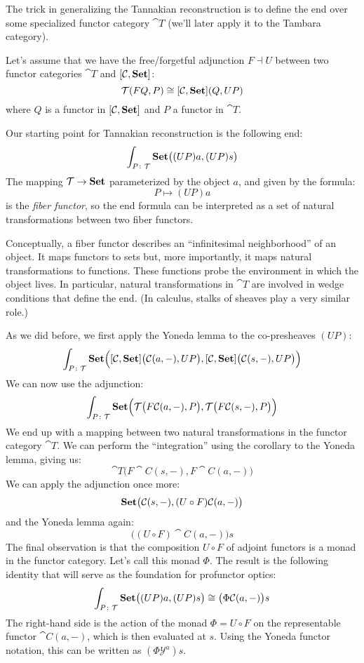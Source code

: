 \documentclass[DaoFP]{subfiles}
\begin{document}
The trick in generalizing the Tannakian reconstruction is to define the end over some specialized functor category $\cat T$ (we'll later apply it to the Tambara category). 

Let's assume that we have the free/forgetful adjunction $F \dashv U$ between two functor categories $\cat T$ and $[\mathcal{C}, \mathbf{Set}]$:
\[ \mathcal{T} (F Q, P) \cong  [\mathcal{C}, \mathbf{Set}] ( Q, U P )\]
where $Q$ is a functor in $[\mathcal{C}, \mathbf{Set}]$ and $P$ a functor in $\cat T$.

Our starting point for Tannakian reconstruction is the following end:
\[ \int_{P \colon \mathcal{T}} \mathbf{Set} \big((U P) a, (U P) s\big) \]
The mapping $\mathcal{T} \to \mathbf{Set}$ parameterized by the object $a$, and given by the formula:
\[ P \mapsto (U P) a \]
is the \emph{fiber functor}, so the end formula can be interpreted as a set of natural transformations between two fiber functors. 

Conceptually, a fiber functor describes an ``infinitesimal neighborhood'' of an object. It maps functors to sets but, more importantly, it maps natural transformations to functions. These functions probe the environment in which the object lives. In particular, natural transformations in $\cat T$ are involved in wedge conditions that define the end. (In calculus, stalks of sheaves play a very similar role.)

As we did before, we first apply the Yoneda lemma to the co-presheaves $(U P)$:
\[ \int_{P \colon \mathcal{T}} \mathbf{Set} \Big([\mathcal{C}, \mathbf{Set}] \big( \mathcal{C} (a ,-), U P\big), [\mathcal{C}, \mathbf{Set}] \big( \mathcal{C} (s ,-), U P\big)\Big) \]
We can now use the adjunction:
\[ \int_{P \colon \mathcal{T}} \mathbf{Set} \Big(\mathcal{T} \big( F \mathcal{C} (a ,-), P\big), \mathcal{T} \big( F \mathcal{C} (s ,-), P\big)\Big) \]
We end up with a mapping between two natural transformations in the functor category $\cat T$. We can perform the ``integration'' using the corollary to the Yoneda lemma, giving us:
\[ \cat T\big( F \cat C (s ,-), F \cat C (a ,-) \big) \]
We can apply the adjunction once more:
\[ \mathbf{Set} \big( \mathcal{C} (s ,-), (U\circ F) \mathcal{C} (a ,-) \big) \]
and the Yoneda lemma again:
\[ \big( (U\circ F) \cat C (a ,-) \big) s \]
The final observation is that the composition $U \circ F$ of adjoint functors is a monad in the functor category. Let's call this monad $\Phi$. The result is the following identity that will serve as the foundation for profunctor optics:
\[ \int_{P \colon \mathcal{T}} \mathbf{Set} \big((U P) a, (U P) s\big) \cong \big( \Phi \mathcal{C} (a ,-) \big) s \]
The right-hand side is the action of the monad $\Phi = U \circ F$ on the representable functor $\cat C (a, -)$, which is then evaluated at $s$. Using the Yoneda functor notation, this can be written as $(\Phi \mathcal Y^a) s$.
\end{document}
